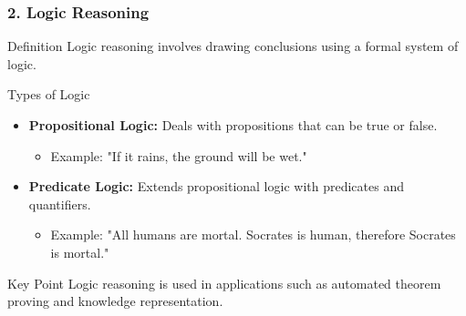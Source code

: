 \documentclass[aspectratio=169]{beamer}
\begin{document}
\begin{frame}[fragile]
    \frametitle{2. Logic Reasoning}
    \begin{block}{Definition}
        Logic reasoning involves drawing conclusions using a formal system of logic.
    \end{block}
    
    \begin{block}{Types of Logic}
        \begin{itemize}
            \item \textbf{Propositional Logic:} Deals with propositions that can be true or false.
                \begin{itemize}
                    \item Example: "If it rains, the ground will be wet."
                \end{itemize}
            \item \textbf{Predicate Logic:} Extends propositional logic with predicates and quantifiers.
                \begin{itemize}
                    \item Example: "All humans are mortal. Socrates is human, therefore Socrates is mortal."
                \end{itemize}
        \end{itemize}
    \end{block}
    
    \begin{block}{Key Point}
        Logic reasoning is used in applications such as automated theorem proving and knowledge representation.
    \end{block}
\end{frame}
\end{document}
